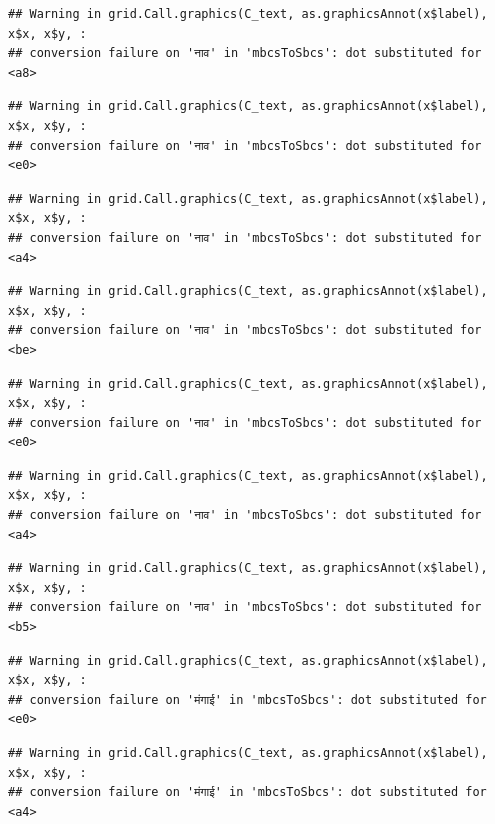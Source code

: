 \documentclass[
]{article}
\begin{document}
\begin{verbatim}
## Warning in grid.Call.graphics(C_text, as.graphicsAnnot(x$label), x$x, x$y, :
## conversion failure on 'नाव' in 'mbcsToSbcs': dot substituted for <a8>
\end{verbatim}

\begin{verbatim}
## Warning in grid.Call.graphics(C_text, as.graphicsAnnot(x$label), x$x, x$y, :
## conversion failure on 'नाव' in 'mbcsToSbcs': dot substituted for <e0>
\end{verbatim}

\begin{verbatim}
## Warning in grid.Call.graphics(C_text, as.graphicsAnnot(x$label), x$x, x$y, :
## conversion failure on 'नाव' in 'mbcsToSbcs': dot substituted for <a4>
\end{verbatim}

\begin{verbatim}
## Warning in grid.Call.graphics(C_text, as.graphicsAnnot(x$label), x$x, x$y, :
## conversion failure on 'नाव' in 'mbcsToSbcs': dot substituted for <be>
\end{verbatim}

\begin{verbatim}
## Warning in grid.Call.graphics(C_text, as.graphicsAnnot(x$label), x$x, x$y, :
## conversion failure on 'नाव' in 'mbcsToSbcs': dot substituted for <e0>
\end{verbatim}

\begin{verbatim}
## Warning in grid.Call.graphics(C_text, as.graphicsAnnot(x$label), x$x, x$y, :
## conversion failure on 'नाव' in 'mbcsToSbcs': dot substituted for <a4>
\end{verbatim}

\begin{verbatim}
## Warning in grid.Call.graphics(C_text, as.graphicsAnnot(x$label), x$x, x$y, :
## conversion failure on 'नाव' in 'mbcsToSbcs': dot substituted for <b5>
\end{verbatim}

\begin{verbatim}
## Warning in grid.Call.graphics(C_text, as.graphicsAnnot(x$label), x$x, x$y, :
## conversion failure on 'मंगाई' in 'mbcsToSbcs': dot substituted for <e0>
\end{verbatim}

\begin{verbatim}
## Warning in grid.Call.graphics(C_text, as.graphicsAnnot(x$label), x$x, x$y, :
## conversion failure on 'मंगाई' in 'mbcsToSbcs': dot substituted for <a4>
\end{verbatim}
\end{document}
